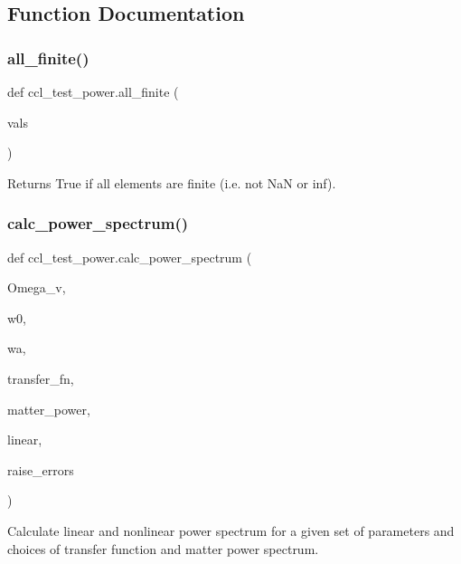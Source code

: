 \subsection{Function Documentation}
\mbox{\label{namespaceccl__test__power_a3be01a8e90fe6de68e6f4560c2ea3e17}} 
\subsubsection{\texorpdfstring{all\+\_\+finite()}{all\_finite()}}
{\footnotesize\ttfamily def ccl\+\_\+test\+\_\+power.\+all\+\_\+finite (\begin{DoxyParamCaption}\item[{}]{vals }\end{DoxyParamCaption})}

\begin{DoxyVerb}Returns True if all elements are finite (i.e. not NaN or inf).
\end{DoxyVerb}
 \mbox{\label{namespaceccl__test__power_a62e19844920cdba6f368f81b3ac3452a}} 
\subsubsection{\texorpdfstring{calc\+\_\+power\+\_\+spectrum()}{calc\_power\_spectrum()}}
{\footnotesize\ttfamily def ccl\+\_\+test\+\_\+power.\+calc\+\_\+power\+\_\+spectrum (\begin{DoxyParamCaption}\item[{}]{Omega\+\_\+v,  }\item[{}]{w0,  }\item[{}]{wa,  }\item[{}]{transfer\+\_\+fn,  }\item[{}]{matter\+\_\+power,  }\item[{}]{linear,  }\item[{}]{raise\+\_\+errors }\end{DoxyParamCaption})}

\begin{DoxyVerb}Calculate linear and nonlinear power spectrum for a given set of parameters
and choices of transfer function and matter power spectrum.
\end{DoxyVerb}
 \mbox{\label{namespaceccl__test__power_a8d91beaaf3981e2e40c68e159a0b5d4b}} 

